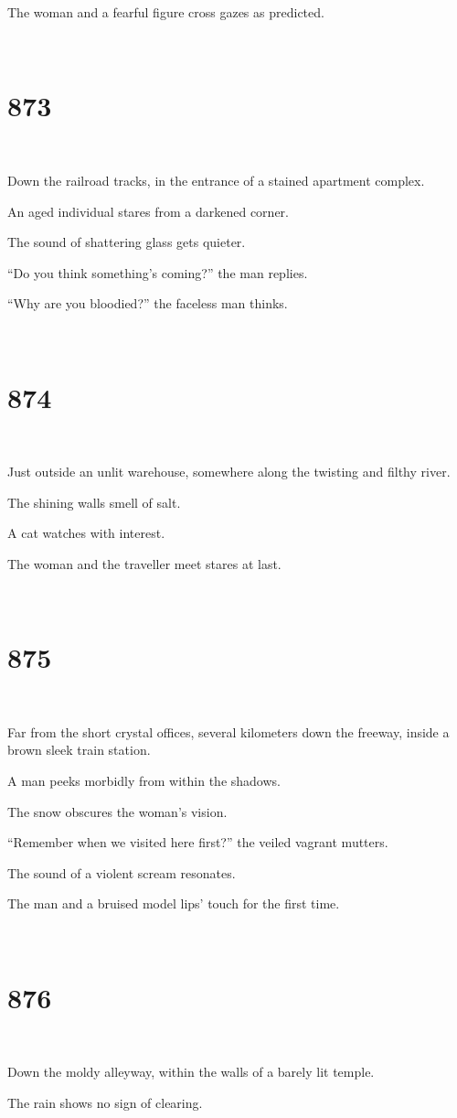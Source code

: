 \documentclass{report}
\begin{document}
The woman and a fearful figure cross gazes as predicted.

~
\chapter*{873}
~

Down the railroad tracks, in the entrance of a stained apartment complex.

An aged individual stares from a darkened corner.

The sound of shattering glass gets quieter.

``Do you think something's coming?'' the man replies.

``Why are you bloodied?'' the faceless man thinks.

~
\chapter*{874}
~

Just outside an unlit warehouse, somewhere along the twisting and filthy river.

The shining walls smell of salt.

A cat watches with interest.

The woman and the traveller meet stares at last.

~
\chapter*{875}
~

Far from the short crystal offices, several kilometers down the freeway, inside a brown sleek train station.

A man peeks morbidly from within the shadows.

The snow obscures the woman's vision.

``Remember when we visited here first?'' the veiled vagrant mutters.

The sound of a violent scream resonates.

The man and a bruised model lips' touch for the first time.

~
\chapter*{876}
~

Down the moldy alleyway, within the walls of a barely lit temple.

The rain shows no sign of clearing.
\end{document}
